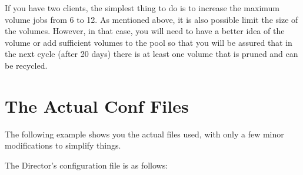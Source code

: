 If you have two clients, the simplest thing to do is to increase the
maximum volume jobs from 6 to 12. As mentioned above, it is also possible
limit the size of the volumes.  However, in that case, you will need to
have a better idea of the volume or add sufficient volumes to the pool so
that you will be assured that in the next cycle (after 20 days) there is
at least one volume that is pruned and can be recycled.


\label{Example}
\section{The Actual Conf Files}

The following example shows you the actual files used, with only a few minor
modifications to simplify things.

The Director's configuration file is as follows:


